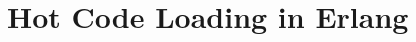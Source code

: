 \documentclass[12pt,a4paper,oneside]{book}
\begin{document}
\frontmatter{}



\tableofcontents{}

\printglossary[nonumberlist,type=\acronymtype]

\mainmatter{}




\chapter{Hot Code Loading in Erlang}












\end{document}
